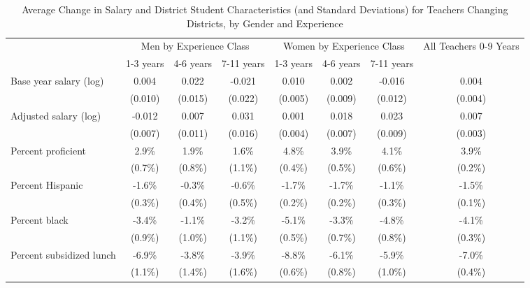 \documentclass[]{article}
\begin{document}
\begin{sidewaystable}[ht]
\centering
\begin{tabular}{lccccccc}
  \hline
 & \multicolumn{3}{c}{Men by Experience Class} & \multicolumn{3}{c}{Women by Experience Class} & \multirow{2}{*}{\parbox{0.09\linewidth}{All Teachers 0-9 Years}}\\ \cline{2-4} \cline{5-7}
 & 1-3 years & 4-6 years & 7-11 years & 1-3 years & 4-6 years & 7-11 years &  \\ 
  \hline
Base year salary (log) & 0.004 & 0.022 & -0.021 & 0.010 & 0.002 & -0.016 & 0.004 \\ 
   & (0.010) & (0.015) & (0.022) & (0.005) & (0.009) & (0.012) & (0.004) \\ 
  Adjusted salary (log) & -0.012 & 0.007 & 0.031 & 0.001 & 0.018 & 0.023 & 0.007 \\ 
   & (0.007) & (0.011) & (0.016) & (0.004) & (0.007) & (0.009) & (0.003) \\ 
  Percent proficient & 2.9\% & 1.9\% & 1.6\% & 4.8\% & 3.9\% & 4.1\% & 3.9\% \\ 
   & (0.7\%) & (0.8\%) & (1.1\%) & (0.4\%) & (0.5\%) & (0.6\%) & (0.2\%) \\ 
  Percent Hispanic & -1.6\% & -0.3\% & -0.6\% & -1.7\% & -1.7\% & -1.1\% & -1.5\% \\ 
   & (0.3\%) & (0.4\%) & (0.5\%) & (0.2\%) & (0.2\%) & (0.3\%) & (0.1\%) \\ 
  Percent black & -3.4\% & -1.1\% & -3.2\% & -5.1\% & -3.3\% & -4.8\% & -4.1\% \\ 
   & (0.9\%) & (1.0\%) & (1.1\%) & (0.5\%) & (0.7\%) & (0.8\%) & (0.3\%) \\ 
  Percent subsidized lunch & -6.9\% & -3.8\% & -3.9\% & -8.8\% & -6.1\% & -5.9\% & -7.0\% \\ 
   & (1.1\%) & (1.4\%) & (1.6\%) & (0.6\%) & (0.8\%) & (1.0\%) & (0.4\%) \\ 
   \hline
\end{tabular}
\caption{Average Change in Salary and District Student Characteristics (and Standard Deviations) for Teachers Changing Districts, by Gender and Experience} 
\label{tbl:change_by_ge}
\end{sidewaystable}
\end{document}

